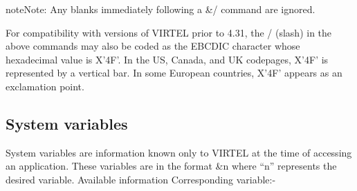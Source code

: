 \documentclass[letterpaper,10pt,english]{sphinxmanual}
\begin{document}
\begin{sphinxadmonition}{note}{Note:}
Any blanks immediately following a \&/ command are ignored.
\end{sphinxadmonition}

For compatibility with versions of VIRTEL prior to 4.31, the / (slash) in the above commands may also be coded as the EBCDIC character whose hexadecimal value is X’4F’. In the US, Canada, and UK codepages, X’4F’ is represented by a vertical bar. In some European countries, X’4F’ appears as an exclamation point.

\ignorespaces 

\subsection{System variables}
\label{\detokenize{connectivity_guide:system-variables}}\label{\detokenize{connectivity_guide:index-119}}
System variables are information known only to VIRTEL at the time of accessing an application. These variables are in the format \&n where “n” represents the desired variable.
Available information Corresponding variable:-
\end{document}
